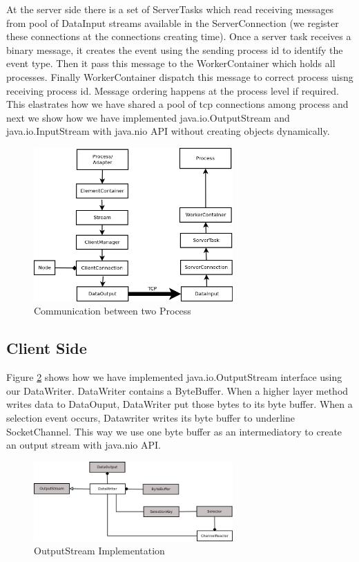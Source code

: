 At the server side there is a set of ServerTasks which read receiving messages from pool of DataInput streams available in the ServerConnection (we register these connections at the connections creating time). Once a server task receives a binary message, it creates the event using the sending process id to identify the event type. Then it pass this message to the WorkerContainer which holds all processes. Finally WorkerContainer dispatch this message to correct process uisng receiving process id. Message ordering happens at the process level if required. This elastrates how we have shared a pool of tcp connections among process and next we show how we have implemented java.io.OutputStream and java.io.InputStream with java.nio API without  creating objects dynamically.
\begin{figure}[!t]
        \centering
        \includegraphics[width=3.0in]{interprocess.png}
        \caption{Communication between two Process}
        \label{interprocess}
\end{figure}
\subsection{Client Side}
Figure \ref{client} shows how we have implemented java.io.OutputStream interface using our DataWriter. DataWriter contains a ByteBuffer. When a higher layer method writes data to DataOuput, DataWriter put those bytes to its byte buffer. When a selection event occurs, Datawriter writes its byte buffer to underline SocketChannel. This way we use one byte buffer as an intermediatory to create an output stream with java.nio API.
\begin{figure}[!t]
        \centering
        \includegraphics[width=3.0in]{client.png}
        \caption{OutputStream Implementation}
        \label{client}
\end{figure}
